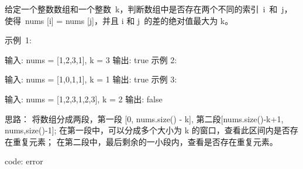 给定一个整数数组和一个整数 k，判断数组中是否存在两个不同的索引 i 和 j，使得 nums [i] = nums [j]，并且 i 和 j 的差的绝对值最大为 k。

示例 1:

输入: nums = [1,2,3,1], k = 3
输出: true
示例 2:

输入: nums = [1,0,1,1], k = 1
输出: true
示例 3:

输入: nums = [1,2,3,1,2,3], k = 2
输出: false






















思路：
将数组分成两段，第一段 [0,  nums.size() - k], 第二段[nums.size()-k+1, nums,size()-1]; 
在第一段中，可以分成多个大小为 k  的窗口，查看此区间内是否存在重复元素；
在第二段中，最后剩余的一小段内，查看是否存在重复元素。




















code:
error